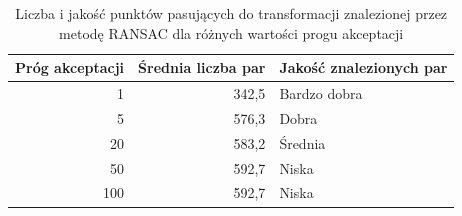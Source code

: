\documentclass{article}
\begin{document}
	\begin{table}[H]
		\centering
		\caption{Liczba i jakość punktów pasujących do transformacji znalezionej przez metodę RANSAC dla różnych wartości progu akceptacji}
		\label{tab:thresh}
		\begin{tabular}{|r|r|l|}
			\hline
			\multicolumn{1}{|l|}{\textbf{Próg akceptacji}} & \multicolumn{1}{l|}{\textbf{Średnia liczba par}} & \textbf{Jakość znalezionych par} \\ \hline
			1                                              & 342,5                                                           & Bardzo dobra                         \\ \hline
			5                                              & 576,3                                                           & Dobra                                \\ \hline
			20                                             & 583,2                                                           & Średnia                              \\ \hline
			50                                             & 592,7                                                           & Niska                                \\ \hline
			100                                            & 592,7                                                           & Niska                                \\ \hline
		\end{tabular}
	\end{table}
\end{document}
